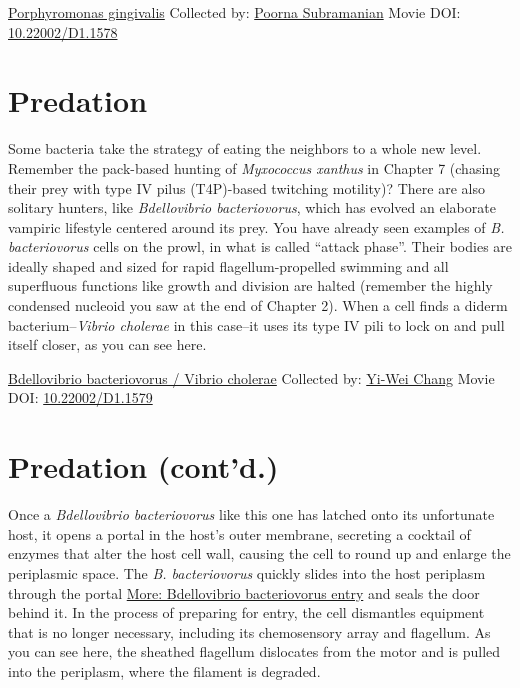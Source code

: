 \documentclass[]{tufte-book}
\begin{document}
\hypertarget{htmlwidget-dc7550f7d744e38be6da}{}

\label{fig:9-8}\protect\hyperlink{tree}{Porphyromonas gingivalis} Collected by: \protect\hyperlink{poorna_subramanian}{Poorna Subramanian} Movie DOI: \href{https://doi.org/10.22002/D1.1578}{10.22002/D1.1578}

\hypertarget{predation}{%
\section{Predation}\label{predation}}

Some bacteria take the strategy of eating the neighbors to a whole new level. Remember the pack-based hunting of \emph{Myxococcus xanthus} in Chapter 7 (chasing their prey with type IV pilus (T4P)-based twitching motility)? There are also solitary hunters, like \emph{Bdellovibrio bacteriovorus}, which has evolved an elaborate vampiric lifestyle centered around its prey. You have already seen examples of \emph{B. bacteriovorus} cells on the prowl, in what is called ``attack phase''. Their bodies are ideally shaped and sized for rapid flagellum-propelled swimming and all superfluous functions like growth and division are halted (remember the highly condensed nucleoid you saw at the end of Chapter 2). When a cell finds a diderm bacterium--\emph{Vibrio cholerae} in this case--it uses its type IV pili to lock on and pull itself closer, as you can see here.



\hypertarget{htmlwidget-fe38052ef017f45708cf}{}

\label{fig:9-9}\protect\hyperlink{tree}{Bdellovibrio bacteriovorus / Vibrio cholerae} Collected by: \protect\hyperlink{yi-wei_chang}{Yi-Wei Chang} Movie DOI: \href{https://doi.org/10.22002/D1.1579}{10.22002/D1.1579}

\hypertarget{predation-contd.}{%
\section{Predation (cont'd.)}\label{predation-contd.}}

Once a \emph{Bdellovibrio bacteriovorus} like this one has latched onto its unfortunate host, it opens a portal in the host's outer membrane, secreting a cocktail of enzymes that alter the host cell wall, causing the cell to round up and enlarge the periplasmic space. The \emph{B. bacteriovorus} quickly slides into the host periplasm through the portal \protect\hyperlink{Bdellovibrio_bacteriovorus_entry}{More: Bdellovibrio bacteriovorus entry} and seals the door behind it. In the process of preparing for entry, the cell dismantles equipment that is no longer necessary, including its chemosensory array and flagellum. As you can see here, the sheathed flagellum dislocates from the motor and is pulled into the periplasm, where the filament is degraded.
\end{document}
